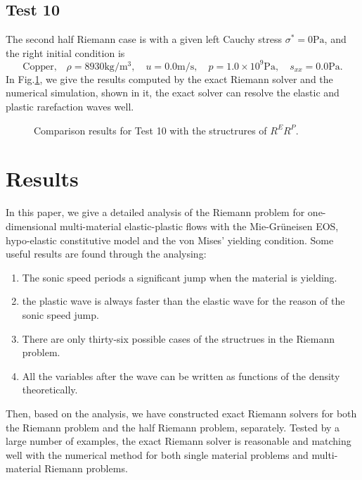 \documentclass{article}
\numberwithin{equation}{section}
\numberwithin{table}{section}
\begin{document}
\subsection{Test 10}
The second half Riemann case is with  a given left Cauchy stress $\sigma^* = 0 \text{Pa}$, and the right initial condition is
\begin{equation}
  \text{Copper,}\quad\rho = 8930\text{kg}/\text{m}^3, \quad  u = 0.0\text{m}/\text{s}, \quad  p =1.0\times 10^9 \text{Pa}, \quad  s_{xx}=0.0\text{Pa}.
\end{equation}
In Fig.\ref{fig:case10}, we give the results computed by the exact Riemann solver and the numerical simulation, shown in it, the exact solver can resolve the elastic and plastic rarefaction waves well.
\begin{figure}
  \centering
    \caption{Comparison results for Test 10 with the structrures of $R^ER^P$.  }
  \label{fig:case10}
\end{figure}
\section{Results}
In this paper, we give a detailed analysis of the Riemann problem for one-dimensional  multi-material elastic-plastic flows with the  Mie-Gr\"uneisen EOS, hypo-elastic constitutive model and the von Mises' yielding condition.  Some useful results are found through the analysing:
\begin{enumerate}
	\item The sonic speed periods a significant jump when the material is yielding.
	\item the plastic wave is always faster than the elastic wave for the reason of the sonic speed jump.
	
	  \item There are only thirty-six possible cases of the structrues in the Riemann problem.
	\item All the variables after the wave can be written as functions of the density theoretically.
	\end{enumerate}
	  Then, based on the analysis, we have constructed exact Riemann solvers for  both the Riemann problem  and the half Riemann problem, separately. Tested by  a large number of examples, the exact Riemann solver is reasonable and matching  well with the numerical method for both  single material problems and multi-material Riemann problems.
\end{document}
